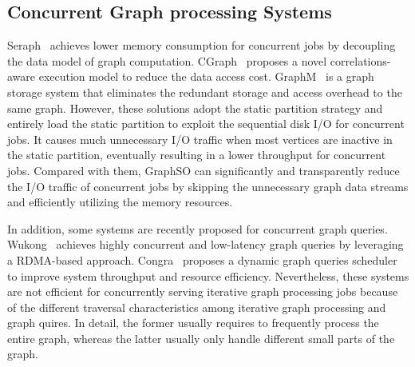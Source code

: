 \documentclass[10pt,journal,compsoc]{IEEEtran}
\begin{document}
\subsection{Concurrent Graph processing Systems}
\vspace{-2pt}
Seraph~\cite{seraph,seraph1} achieves lower memory consumption for concurrent jobs by decoupling the data model of graph computation.
CGraph~\cite{CGraph,CGraph2019} proposes a novel correlations-aware execution model to reduce the data access cost.
GraphM~\cite{GraphM} is a graph storage system that eliminates the redundant storage and access overhead to the same graph.
However, these solutions adopt the static partition strategy and entirely load the static partition to exploit the sequential disk I/O for concurrent jobs. It causes much unnecessary I/O traffic when most vertices are inactive in the static partition, eventually resulting in a lower throughput for concurrent jobs.
Compared with them, GraphSO can significantly and transparently reduce the I/O traffic of concurrent jobs by skipping the unnecessary graph data streams and efficiently utilizing the memory resources.

In addition, some systems are recently proposed for concurrent graph queries. Wukong~\cite{Wukong} achieves highly concurrent and low-latency graph queries by leveraging a RDMA-based approach. Congra~\cite{Congra,CongraPlus} proposes a dynamic graph queries scheduler to improve system throughput and resource efficiency. Nevertheless, these systems are not efficient for concurrently serving iterative graph processing jobs because of the different traversal characteristics among iterative graph processing and graph quires. In detail, the former usually requires to frequently process the entire graph, whereas the latter usually only handle different small parts of the graph.

\vspace{-10pt}
\end{document}
